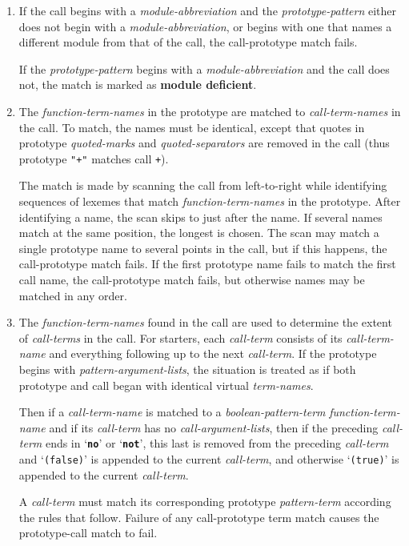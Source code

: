 \documentclass[12pt]{article}
\newcommand{\TT}[1]{{\tt \bfseries #1}}
\newcommand{\key}[1]{{\rm \bfseries #1}}
\begin{document}
\begin{enumerate}
\item If the call begins with a {\em module-abbreviation}
and the {\em prototype-pattern}
either does not begin with a {\em module-abbreviation},
or begins with one that names a different module from that of the call,
the call-prototype match fails.

If the {\em prototype-pattern} begins with a {\em module-abbreviation}
and the call does not, the match is marked as
\key{module deficient}\label{MODULE-DEFICIENT}.

\item The {\em function-term-names} in the prototype are matched to
{\em call-term-names} in the call.  To match, the names must be identical,
except that quotes in prototype
{\em quoted-marks} and {\em quoted-separators} are removed in the call
(thus prototype {\tt "+"} matches call {\tt +}).

The match is made by scanning the call from left-to-right
while identifying sequences of lexemes that match
{\em function-term-names} in the prototype.  After identifying
a name, the scan skips to just after the name.  If several
names match at the same position, the longest is chosen.
The scan may match a single prototype name to several points in the
call, but if this happens, the call-prototype match fails.
If the first prototype name fails to match the first call name,
the call-prototype match fails, but otherwise names may be matched
in any order.

\item
The {\em function-term-names} found in the call are used to determine
the extent of {\em call-terms} in the call.  For starters, each
{\em call-term} consists of its {\em call-term-name} and everything
following up to the next {\em call-term}.  If the prototype begins
with {\em pattern-argument-lists}, the situation is treated as
if both prototype and call began with identical virtual
{\em term-names}.

Then if a {\em call-term-name} is matched to a {\em boolean-pattern-term}
{\em function-term-name} and if its {\em call-term} has no
{\em call-argument-lists}, then if the preceding {\em call-term}
ends in `\TT{no}' or `\TT{not}', this last is removed from the
preceding {\em call-term} and `{\tt (false)}' is appended to the
current {\em call-term}, and otherwise `{\tt (true)}' is appended to the
current {\em call-term}.

A {\em call-term}
must match its corresponding prototype {\em pattern-term} according
the rules that follow.  Failure of any call-prototype term match
causes the prototype-call match to fail.


\end{enumerate}
\end{document}
